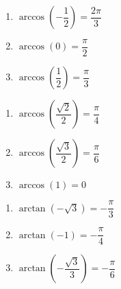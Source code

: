 \documentclass{ximera}
\begin{document}
\begin{multicols}{3} 

\begin{enumerate}

\setcounter{enumi}{\value{HW}}

\item $\arccos \left( -\dfrac{1}{2} \right) = \dfrac{2\pi}{3}$
\item $\arccos \left( 0 \right) = \dfrac{\pi}{2}$ 
\item $\arccos \left( \dfrac{1}{2} \right) = \dfrac{\pi}{3}$

\setcounter{HW}{\value{enumi}}

\end{enumerate}

\end{multicols}

\begin{multicols}{3} 

\begin{enumerate}

\setcounter{enumi}{\value{HW}}

\item $\arccos \left( \dfrac{\sqrt{2}}{2} \right) = \dfrac{\pi}{4}$
\item $\arccos \left( \dfrac{\sqrt{3}}{2} \right) = \dfrac{\pi}{6}$
\item $\arccos \left( 1 \right) = 0$ 

\setcounter{HW}{\value{enumi}}

\end{enumerate}

\end{multicols}

\begin{multicols}{3} 

\begin{enumerate}

\setcounter{enumi}{\value{HW}}

\item $\arctan \left( -\sqrt{3} \right) = -\dfrac{\pi}{3}$ 
\item $\arctan \left( -1 \right) = -\dfrac{\pi}{4}$ 
\item $\arctan \left( -\dfrac{\sqrt{3}}{3} \right) = -\dfrac{\pi}{6}$

\setcounter{HW}{\value{enumi}}

\end{enumerate}

\end{multicols}
\end{document}
